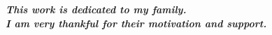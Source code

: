 \begin{dedication}
 \bf \it This work is dedicated to my family.\\I am very thankful for their motivation and support.
\end{dedication}


\makecertificate

\makeapproval





\thispagestyle{empty}
%
    \makedeclaration




%
%
%
